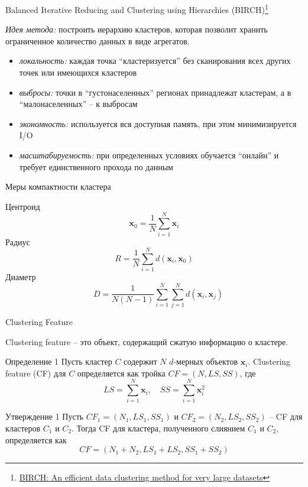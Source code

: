 \documentclass[aspectratio=169]{beamer}
\begin{document}
\begin{frame}{Balanced Iterative Reducing and Clustering using Hierarchies (BIRCH)\footnote{\href{http://www.cs.sfu.ca/CourseCentral/459/han/papers/zhang96.pdf}{BIRCH: An efficient data clustering method for very large datasets}}}

{\it Идея метода:} построить иерархию кластеров, которая позволит хранить ограниченное количество данных в виде агрегатов.

\vspace{1em}
\begin{itemize}
\item {\it локальность:} каждая точка ``кластеризуется'' без сканирования всех других точек или имеющихся кластеров
\item {\it выбросы:} точки в ``густонаселенных'' регионах принадлежат кластерам, а в ``малонаселенных'' --  к выбросам 
\item {\it экономность:} используется вся доступная память, при этом минимизируется I/O
\item {\it масштабируемость:} при определенных условиях обучается ``онлайн'' и требует единственного прохода по данным
\end{itemize}

\end{frame}

\begin{frame}{Меры компактности кластера}

Центроид
\[
\mathbf{x}_0 = \frac{1}{N} \sum_{i=1}^N \mathbf{x}_i
\]
Радиус
\[
R = \frac{1}{N} \sum_{i=1}^N d(\mathbf{x}_i, \mathbf{x}_0)
\]
Диаметр
\[ 
\quad D = \frac{1}{N(N-1)} \sum_{i=1}^N \sum_{j=1}^N d(\mathbf{x}_i, \mathbf{x}_j)
\]

\end{frame}

\begin{frame}{Clustering Feature}

Clustering feature -- это объект, содержащий сжатую информацию о кластере.

\vspace{1em}
\begin{block}{Определение 1}
Пусть кластер $C$ содержит $N$ $d$-мерных объектов $\mathbf{x}_i$. Clustering feature (CF) для $C$ определяется как тройка $CF = (N, LS, SS)$, где 
\[
LS = \sum_{i=1}^N \mathbf{x}_i, \quad SS = \sum_{i=1}^N \mathbf{x}^2_i
\]
\end{block}
\begin{block}{Утверждение 1}
Пусть $CF_1 = (N_1, LS_1, SS_1)$ и $CF_2 = (N_2, LS_2, SS_2)$ -- CF для кластеров $C_1$ и $C_2$. Тогда CF для кластера, полученного слиянием $C_1$ и $C_2$, определяется как
\[
CF = (N_1 + N_2, LS_1 + LS_2, SS_1 + SS_2)
\]

\end{block}

\end{frame}
\end{document}
